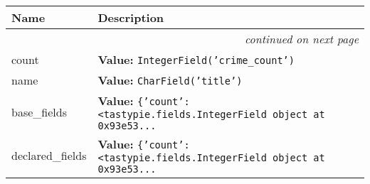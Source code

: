     \vspace{-1cm}
\hspace{\varindent}\begin{longtable}{|p{\varnamewidth}|p{\vardescrwidth}|l}
\cline{1-2}
\cline{1-2} \centering \textbf{Name} & \centering \textbf{Description}& \\
\cline{1-2}
\endhead\cline{1-2}\multicolumn{3}{r}{\small\textit{continued on next page}}\\\endfoot\cline{1-2}
\endlastfoot\raggedright c\-o\-u\-n\-t\- & \raggedright \textbf{Value:} 
{\tt IntegerField('crime\_count')}&\\
\cline{1-2}
\raggedright n\-a\-m\-e\- & \raggedright \textbf{Value:} 
{\tt CharField('title')}&\\
\cline{1-2}
\raggedright b\-a\-s\-e\-\_\-f\-i\-e\-l\-d\-s\- & \raggedright \textbf{Value:} 
{\tt \texttt{\{}\texttt{'}\texttt{count}\texttt{'}\texttt{: }{\textless}tastypie.fields.IntegerField object at 0x93e53\texttt{...}}&\\
\cline{1-2}
\raggedright d\-e\-c\-l\-a\-r\-e\-d\-\_\-f\-i\-e\-l\-d\-s\- & \raggedright \textbf{Value:} 
{\tt \texttt{\{}\texttt{'}\texttt{count}\texttt{'}\texttt{: }{\textless}tastypie.fields.IntegerField object at 0x93e53\texttt{...}}&\\
\cline{1-2}
\end{longtable}

